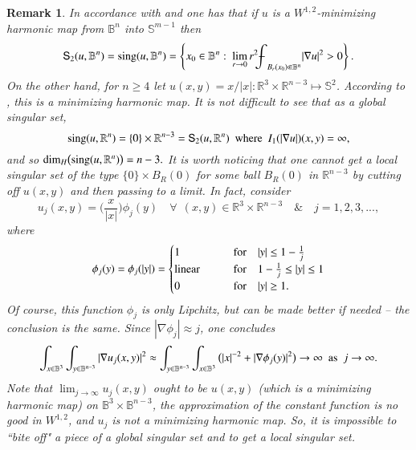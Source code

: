 \documentclass[12pt]{amsart}
\newtheorem{remark}[theorem]{Remark}
\begin{document}
\begin{remark} In accordance with \cite[page 105]{G1983} and \cite[Corollary 2.2.8]{LW2008} one has that if $u$ is a $W^{1,2}$-minimizing harmonic map from $\mathbb B^n$ into $\mathbb S^{m-1}$ then
$$
\mathsf{S}_2(u,\mathbb B^n)=\hbox{sing}(u,\mathbb B^n)=\left\{x_0\in\mathbb B^n:\ \lim_{r\to 0}r^2{{\mathchoice
{{{\setbox0=\hbox{$\displaystyle{\textstyle{-}}{\int}$ }
\vcenter{\hbox{$\textstyle{-}$ }}\kern-.6\wd0}}}{{{\setbox0=\hbox{$\textstyle{\scriptstyle{-}}{\int}$ }
\vcenter{\hbox{$\scriptstyle{-}$ }}\kern-.6\wd0}}}{{{\setbox0=\hbox{$\scriptstyle{\scriptscriptstyle{-}}{\int}$ }
\vcenter{\hbox{$\scriptscriptstyle{-}$ }}\kern-.6\wd0}}}{{{\setbox0=\hbox{$\scriptscriptstyle{\scriptscriptstyle{-}}{\int}$ }
\vcenter{\hbox{$\scriptscriptstyle{-}$ }}\kern-.6\wd0}}}\!\int}}_{B_r(x_0)\Subset\mathbb B^n}|\nabla u|^2>0\right\}.
$$
On the other hand, for $n\ge 4$ let $u(x,y)=x/|x|: \mathbb
R^3\times\mathbb R^{n-3}\mapsto \mathbb S^2$. According to
\cite[Page 16]{LW2008}, this is a minimizing harmonic map. It is
not difficult to see that as a global singular set,
$$
\hbox{sing}(u,\mathbb R^n)=\{0\}\times \mathbb
R^{n-3}=\mathsf{S}_2(u,\mathbb R^n)\ \ \hbox{where}\ \ I_1(|\nabla
u|)(x,y)=\infty,
$$
and so $\hbox{dim}_H\big(\hbox{sing}(u,\mathbb R^n)\big)=n-3.$
It is worth noticing that one cannot get a local singular set of the
type $\{0\}\times B_R(0)$ for some ball $B_R(0)$ in $\mathbb
R^{n-3}$ by cutting off $u(x,y)$ and then passing to a limit. In
fact, consider
$$
u_j(x,y)=\Big(\frac{x}{|x|}\Big)\phi_j(y)\quad\forall\ \
(x,y)\in\mathbb R^3\times\mathbb R^{n-3}\quad\&\quad j=1,2,3,...,
$$
where
$$
\phi_j(y)=\phi_j(|y|)=\begin{cases} 1\quad &\quad \hbox{for}\quad |y|\le 1-\frac1j\\
\hbox{linear}\quad &\quad \hbox{for}\quad 1-\frac1j\le |y|\le 1\\
0\quad &\quad \hbox{for}\quad |y|\ge 1.
\end{cases}
$$
Of course, this function $\phi_j$ is only Lipchitz, but can be made
better if needed -- the conclusion is the same. Since $|\nabla
\phi_j|\approx j$, one concludes
$$
\int_{x\in\mathbb B^3}\int_{y\in\mathbb B^{n-3}}|\nabla
u_j(x,y)|^2\approx \int_{y\in\mathbb B^{n-3}}\int_{x\in\mathbb
B^3}\big(|x|^{-2}+|\nabla\phi_j(y)|^2\big)\to\infty\ \ \hbox{as}\ \
j\to\infty.
$$
Note that $\lim_{j\to\infty}u_j(x,y)$ ought to be $u(x,y)$ (which is
a minimizing harmonic map) on $\mathbb B^3\times\mathbb B^{n-3}$, the
approximation of the constant function is no good in $W^{1,2}$, and
$u_j$ is not a minimizing harmonic map. So, it is impossible to ``bite off" a
piece of a global singular set and to get a local singular set.
\end{remark}
\end{document}
